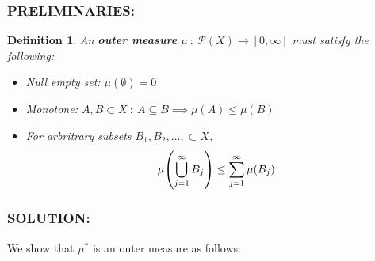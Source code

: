 \documentclass[]{article}
\newcommand{\Solution}{\subsubsection*{\textbf{SOLUTION:}}}
\newcommand{\Preliminaries}{\subsubsection*{\textbf{PRELIMINARIES:}}}
\newcommand{\st}{\ : \ }
\newtheorem{definition}{Definition}
\begin{document}
\Preliminaries
\begin{definition}
    An \textbf{outer measure} $\mu \st \mathcal{P}(X) \to [0,\infty]$ must satisfy the following:
    \begin{itemize}
        \item Null empty set: $\mu(\emptyset) = 0$
        \item Monotone: $A,B\subset X \st A \subseteq B \implies \mu(A) \leq \mu(B)$
        \item For arbritrary subsets $B_1,B_2,\dots,\subset X$,\[
            \mu \qty(\bigcup_{j=1}^{\infty} B_j) \leq \sum_{j=1}^{\infty} \mu(B_j)
        \]
    \end{itemize}
\end{definition}

\Solution
We show that $\mu^*$ is an outer measure as follows:
\end{document}
